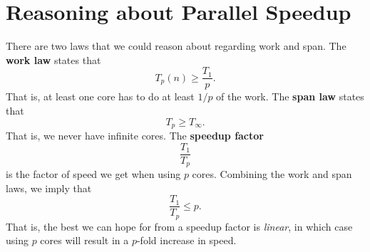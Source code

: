 \documentclass[titlepage, 12pt, leqno]{article}
\begin{document}
\pagebreak
\section{Reasoning about Parallel Speedup}
There are two laws that we could reason about regarding work and span. 
The \textbf{work law} states that
\[
T_{p}(n) \ge \frac{T_{1}}{p}.
\]
That is, at least one core has to do at least $1/p$ of the work. The \textbf{span
law} states that
\[
T_{p} \ge T_{\infty}.
\]
That is, we never have infinite cores. The \textbf{speedup factor}
\[
\frac{T_{1}}{T_{p}}
\]
is the factor of speed we get when using $p$ cores. Combining the work and
span laws, we imply that
\[
\frac{T_{1}}{T_{p}} \le p.
\]
That is, the best we can hope for from a speedup factor is \textit{linear}, in
which case using $p$ cores will result in a $p$-fold increase in speed.
\end{document}
